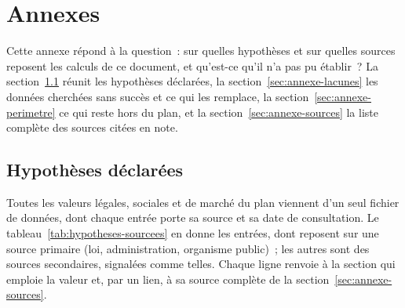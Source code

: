 \section{Annexes}\label{sec:annexes}

Cette annexe r\'epond \`a la question~: sur quelles hypoth\`eses et sur quelles sources reposent les
calculs de ce document, et qu'est-ce qu'il n'a pas pu \'etablir~? La
section~\ref{sec:annexe-hypotheses} r\'eunit les hypoth\`eses d\'eclar\'ees, la
section~\ref{sec:annexe-lacunes} les donn\'ees cherch\'ees sans succ\`es et ce qui les remplace, la
section~\ref{sec:annexe-perimetre} ce qui reste hors du plan, et la section~\ref{sec:annexe-sources}
la liste compl\`ete des sources cit\'ees en note.

\subsection{Hypoth\`eses d\'eclar\'ees}\label{sec:annexe-hypotheses}

Toutes les valeurs l\'egales, sociales et de march\'e du plan viennent d'un seul fichier de donn\'ees,
dont chaque entr\'ee porte sa source et sa date de consultation. Le
tableau~\ref{tab:hypotheses-sourcees} en donne les \NombreHypothesesSourcees{} entr\'ees, dont
\NombreHypothesesPrimaires{} reposent sur une source primaire (loi, administration, organisme
public)~; les autres sont des sources secondaires, signal\'ees comme telles. Chaque ligne renvoie \`a la
section qui emploie la valeur et, par un lien, \`a sa source compl\`ete de la
section~\ref{sec:annexe-sources}.

